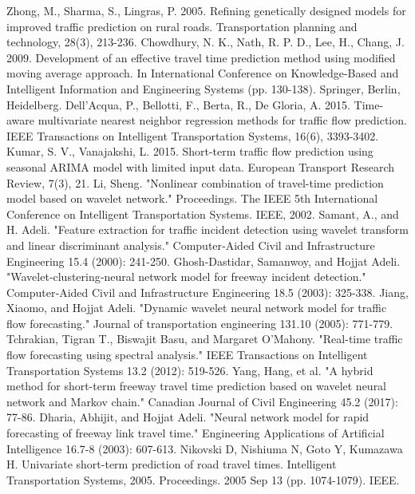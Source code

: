 \documentclass[a4paper, 10pt, conference]{ieeeconf}      %
\begin{document}
\begin{thebibliography}{00}
 Zhong, M., Sharma, S., Lingras, P. 2005. Refining genetically designed models for improved traffic prediction on rural roads. Transportation planning and technology, 28(3), 213-236.
 Chowdhury, N. K., Nath, R. P. D., Lee, H., Chang, J. 2009. Development of an effective travel time prediction method using modified moving average approach. In International Conference on Knowledge-Based and Intelligent Information and Engineering Systems (pp. 130-138). Springer, Berlin, Heidelberg.
 Dell'Acqua, P., Bellotti, F., Berta, R., De Gloria, A. 2015. Time-aware multivariate nearest neighbor regression methods for traffic flow prediction. IEEE Transactions on Intelligent Transportation Systems, 16(6), 3393-3402.
 Kumar, S. V., Vanajakshi, L. 2015. Short-term traffic flow prediction using seasonal ARIMA model with limited input data. European Transport Research Review, 7(3), 21.
 Li, Sheng. "Nonlinear combination of travel-time prediction model based on wavelet network." Proceedings. The IEEE 5th International Conference on Intelligent Transportation Systems. IEEE, 2002.
 Samant, A., and H. Adeli. "Feature extraction for traffic incident detection using wavelet transform and linear discriminant analysis." Computer‐Aided Civil and Infrastructure Engineering 15.4 (2000): 241-250.
 Ghosh‐Dastidar, Samanwoy, and Hojjat Adeli. "Wavelet‐clustering‐neural network model for freeway incident detection." Computer‐Aided Civil and Infrastructure Engineering 18.5 (2003): 325-338.
 Jiang, Xiaomo, and Hojjat Adeli. "Dynamic wavelet neural network model for traffic flow forecasting." Journal of transportation engineering 131.10 (2005): 771-779.
 Tchrakian, Tigran T., Biswajit Basu, and Margaret O'Mahony. "Real-time traffic flow forecasting using spectral analysis." IEEE Transactions on Intelligent Transportation Systems 13.2 (2012): 519-526.
 Yang, Hang, et al. "A hybrid method for short-term freeway travel time prediction based on wavelet neural network and Markov chain." Canadian Journal of Civil Engineering 45.2 (2017): 77-86.
 Dharia, Abhijit, and Hojjat Adeli. "Neural network model for rapid forecasting of freeway link travel time." Engineering Applications of Artificial Intelligence 16.7-8 (2003): 607-613.
 Nikovski D, Nishiuma N, Goto Y, Kumazawa H. Univariate short-term prediction of road travel times. Intelligent Transportation Systems, 2005. Proceedings. 2005 Sep 13 (pp. 1074-1079). IEEE.

\end{thebibliography}
\end{document}
